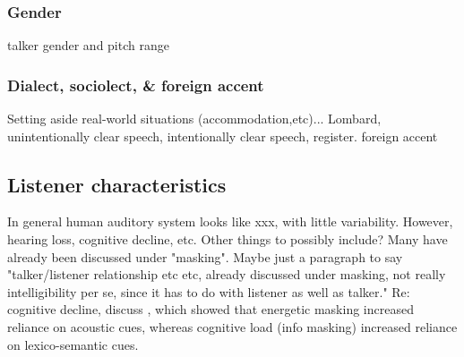\subsubsection{Gender}
talker gender and pitch range \citep[e.g.,][]{BradlowEtAl1996}

\subsubsection{Dialect, sociolect, \& foreign accent}
Setting aside real-world situations (accommodation,etc)...  Lombard, unintentionally clear speech, intentionally clear speech, register.  foreign accent \citep{SmiljanicBradlow2011}

\subsection{Listener characteristics}
In general human auditory system looks like xxx, with little variability.  However, hearing loss, cognitive decline, etc.  Other things to possibly include?  Many have already been discussed under "masking".  Maybe just a paragraph to say "talker/listener relationship etc etc, already discussed under masking, not really intelligibility per se, since it has to do with listener as well as talker."  Re: cognitive decline, discuss \citep{MattysEtAl2009}, which showed that energetic masking increased reliance on acoustic cues, whereas cognitive load (info masking) increased reliance on lexico-semantic cues. 


